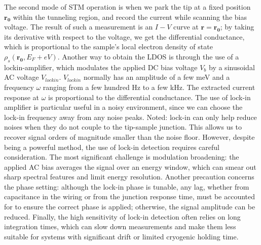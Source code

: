 The second mode of \ac{STM} operation is when we park the tip at a fixed position $\mathbf{r_0}$ within the tunneling region, and record the current while scanning the bias voltage. The result of such a measurement is an $I-V$ curve at $\mathbf{r} = \mathbf{r_0}$; by taking its derivative with respect to the voltage, we get the differential conductance, which is proportional to the sample's local electron density of state $\rho_s(\mathbf{r_0}, E_F+eV)$. Another way to obtain the LDOS is through the use of a lockin-amplifier, which modulates the applied DC bias voltage $V_b$ by a sinusoidal AC voltage $V_{lockin}$.  $V_{lockin}$ normally has an amplitude of a few meV and a frequency $\omega$ ranging from a few hundred Hz to a few kHz. The extracted current response at $\omega$ is proportional to the differential conductance. The use of lock-in amplifier is particular useful in a noisy environment, since we can choose the lock-in frequency away from any noise peaks. Noted: lock-in can only help reduce noises when they do not couple to the tip-sample junction. This allows us to recover signal orders of magnitude smaller than the noise floor. However, despite being a powerful method, the use of lock-in detection requires careful consideration. The most significant challenge is modulation broadening: the applied AC bias averages the signal over an energy window, which can smear out sharp spectral features and limit energy resolution. Another precaution concerns the phase setting: although the lock-in phase is tunable, any lag, whether from capacitance in the wiring or from the junction response time, must be accounted for to ensure the correct phase is applied; otherwise, the signal amplitude can be reduced. Finally, the high sensitivity of lock-in detection often relies on long integration times, which can slow down measurements and make them less suitable for systems with significant drift or limited cryogenic holding time.

